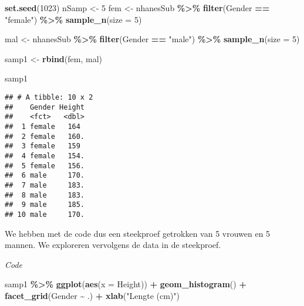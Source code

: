 \documentclass[
  12pt,dutch,coursenotes]{book}
\newenvironment{Shaded}{\begin{snugshade}}{\end{snugshade}}
\newcommand{\DataTypeTok}[1]{\textcolor[rgb]{0.13,0.29,0.53}{#1}}
\newcommand{\DecValTok}[1]{\textcolor[rgb]{0.00,0.00,0.81}{#1}}
\newcommand{\KeywordTok}[1]{\textcolor[rgb]{0.13,0.29,0.53}{\textbf{#1}}}
\newcommand{\NormalTok}[1]{#1}
\newcommand{\OperatorTok}[1]{\textcolor[rgb]{0.81,0.36,0.00}{\textbf{#1}}}
\newcommand{\StringTok}[1]{\textcolor[rgb]{0.31,0.60,0.02}{#1}}
\theoremstyle{definition}
\theoremstyle{definition}
\theoremstyle{definition}
\theoremstyle{remark}
\begin{document}
\begin{Shaded}
\begin{Highlighting}[]
\KeywordTok{set.seed}\NormalTok{(}\DecValTok{1023}\NormalTok{)}
\NormalTok{nSamp \textless{}{-}}\StringTok{ }\DecValTok{5}
\NormalTok{fem \textless{}{-}}\StringTok{ }\NormalTok{nhanesSub }\OperatorTok{\%\textgreater{}\%}\StringTok{ }\KeywordTok{filter}\NormalTok{(Gender }\OperatorTok{==}\StringTok{ "female"}\NormalTok{) }\OperatorTok{\%\textgreater{}\%}\StringTok{ }
\StringTok{    }\KeywordTok{sample\_n}\NormalTok{(}\DataTypeTok{size =} \DecValTok{5}\NormalTok{)}

\NormalTok{mal \textless{}{-}}\StringTok{ }\NormalTok{nhanesSub }\OperatorTok{\%\textgreater{}\%}\StringTok{ }\KeywordTok{filter}\NormalTok{(Gender }\OperatorTok{==}\StringTok{ "male"}\NormalTok{) }\OperatorTok{\%\textgreater{}\%}\StringTok{ }\KeywordTok{sample\_n}\NormalTok{(}\DataTypeTok{size =} \DecValTok{5}\NormalTok{)}

\NormalTok{samp1 \textless{}{-}}\StringTok{ }\KeywordTok{rbind}\NormalTok{(fem, mal)}

\NormalTok{samp1}
\end{Highlighting}
\end{Shaded}

\begin{verbatim}
## # A tibble: 10 x 2
##    Gender Height
##    <fct>   <dbl>
##  1 female   164 
##  2 female   160.
##  3 female   159 
##  4 female   154.
##  5 female   156.
##  6 male     170.
##  7 male     183.
##  8 male     183.
##  9 male     185.
## 10 male     170.
\end{verbatim}

We hebben met de code dus een steekproef getrokken van 5 vrouwen en 5 mannen.
We exploreren vervolgens de data in de steekproef.

\emph{Code}

\begin{Shaded}
\begin{Highlighting}[]
\NormalTok{samp1 }\OperatorTok{\%\textgreater{}\%}\StringTok{ }\KeywordTok{ggplot}\NormalTok{(}\KeywordTok{aes}\NormalTok{(}\DataTypeTok{x =}\NormalTok{ Height)) }\OperatorTok{+}\StringTok{ }\KeywordTok{geom\_histogram}\NormalTok{() }\OperatorTok{+}\StringTok{ }
\StringTok{    }\KeywordTok{facet\_grid}\NormalTok{(Gender }\OperatorTok{\textasciitilde{}}\StringTok{ }\NormalTok{.) }\OperatorTok{+}\StringTok{ }\KeywordTok{xlab}\NormalTok{(}\StringTok{"Lengte (cm)"}\NormalTok{)}
\end{Highlighting}
\end{Shaded}
\end{document}
